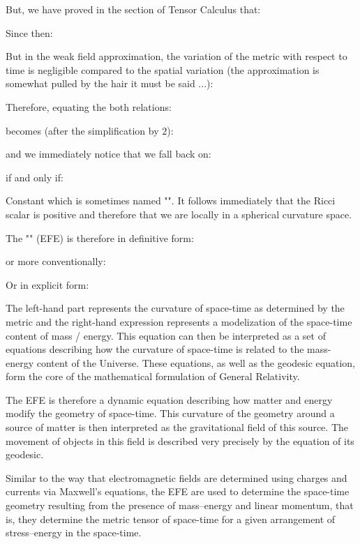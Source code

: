 	But, we have proved in the section of Tensor Calculus that:
	
	Since then:
	
	But in the weak field approximation, the variation of the metric with respect to time is negligible compared to the spatial variation (the approximation is somewhat pulled by the hair it must be said ...):
	
	Therefore, equating the both relations:
	
	becomes (after the simplification by $2$):
	
	and we immediately notice that we fall back on:
	
	if and only if:
	
	Constant which is sometimes named "". It follows immediately that the Ricci scalar is positive and therefore that we are locally in a spherical curvature space.

	The "" (EFE) is therefore in definitive form:
	
	or more conventionally:
	
	Or in explicit form:
	
	The left-hand part represents the curvature of space-time as determined by the metric and the right-hand expression represents a modelization of the space-time content of mass / energy. This equation can then be interpreted as a set of equations describing how the curvature of space-time is related to the mass-energy content of the Universe. These equations, as well as the geodesic equation, form the core of the mathematical formulation of General Relativity.
	
	The EFE is therefore a dynamic equation describing how matter and energy modify the geometry of space-time. This curvature of the geometry around a source of matter is then interpreted as the gravitational field of this source. The movement of objects in this field is described very precisely by the equation of its geodesic.
	
	Similar to the way that electromagnetic fields are determined using charges and currents via Maxwell's equations, the EFE are used to determine the space-time geometry resulting from the presence of mass–energy and linear momentum, that is, they determine the metric tensor of space-time for a given arrangement of stress–energy in the space-time. 
	
